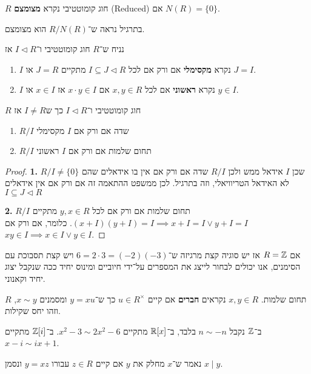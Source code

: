 \begin{definition}
	$R$ חוג קומוטטיבי נקרא \textbf{מצומצם} (Reduced) אם $N(R) = \{ 0 \}$.
\end{definition}
בתרגיל נראה ש־$R / N(R)$ הוא מצומצם.
\begin{definition}
	נניח ש־$R$ חוג קומוטטיבי ו־$I \triangleleft R$ אז
	\begin{enumerate}
		\item $I$ נקרא \textbf{מקסימלי} אם ורק אם לכל $I \subseteq J \triangleleft R$ מתקיים $J = R$ או $J = I$.
		\item $I$ נקרא \textbf{ראשוני} אם לכל $x, y \in R$ אם $x \cdot y \in I$ אז $x \in I$ או $y \in I$.
	\end{enumerate}
\end{definition}
\begin{proposition}
	$R$ חוג קומוטטיבי ו־$I \triangleleft R$ כך ש$I \ne R$ אז
	\begin{enumerate}
		\item $R / I$ שדה אם ורק אם $I$ מקסימלי
		\item $R / I$ תחום שלמות אם ורק אם $I$ ראשוני
	\end{enumerate}
\end{proposition}
\begin{proof}
	\textbf{1.}
	$R / I \ne \{ 0 \}$ שכן $I$ אידאל ממש ולכן $R / I$ שדה אם ורק אם אין בו אידאלים שהם לא האידאל הטריוויאלי, וזה בתרגיל.
	לכן ממשפט ההתאמה זה אם ורק אם אין אידאלים $I \subseteq J \triangleleft R$

	\textbf{2.}
	$R / I$ תחום שלמות אם ורק אם לכל $y, x \in R$ מתקיים $(x + I)(y + I) = I \implies x + I = I \lor y + I = I$.
	כלומר, אם ורק אם $xy \in I \implies x \in I \lor y \in I$.
\end{proof}
אם $R = \mathbb{Z}$ אז יש סוגיה קצת מרגיזה ש־$6 = 2 \cdot 3 = (-2)(-3)$ ויש קצת תסבוכת עם הסימנים, אנו יכולים לבחור לייצג את המספרים על־ידי חיוביים ומינוס יחיד ככה שנקבל יצוג יחיד וקאנוני.
\begin{definition}[חברים]
	$R$ תחום שלמות. $x, y \in R$ נקראים \textbf{חברים} אם קיים $u \in R^\times$ כך ש־$y = xu$ ומסמנים $x \sim y$, וזהו יחס שקילות.
\end{definition}
\begin{example}
	ב־$\mathbb{Z}$ נקבל $n \sim -n$ בלבד, ב־$\mathbb{R}[x]$ מתקיים $x^2 - 3 \sim 2x^2 - 6$.
	ב־$\mathbb{Z}[i]$ מתקיים $x - i \sim ix + 1$.
\end{example}
\begin{definition}[מחלק]
	נאמר ש־$x$ מחלק את $y$ אם קיים $z \in R$ עבורו $y = xz$ ונסמן $x \mid y$.
\end{definition}
